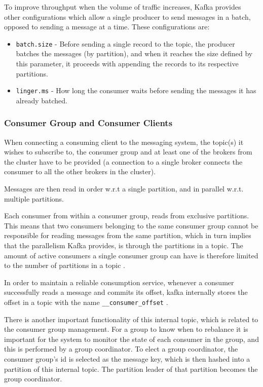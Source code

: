 To improve throughput when the volume of traffic increases, Kafka provides other configurations which allow a single producer to send messages in a batch, opposed to sending a message at a time. These configurations are:
\begin{itemize}
    \item \texttt{batch.size} - Before sending a single record to the topic, the producer batches the messages (by partition), and when it reaches the size defined by this parameter, it proceeds with appending the records to its respective partitions. 
    \item \texttt{linger.ms} - How long the consumer waits before sending the messages it has already batched.
\end{itemize}

\subsubsection{Consumer Group and Consumer Clients}

When connecting a consuming client to the messaging system, the topic(s) it wishes to subscribe to, the consumer group and at least one of the brokers from the cluster have to be provided (a connection to a single broker connects the consumer to all the other brokers in the cluster). 

Messages are then read in order w.r.t a single partition, and in parallel w.r.t. multiple partitions.

Each consumer from within a consumer group, reads from exclusive partitions. This means that two consumers belonging to the same consumer group cannot be responsible for reading messages from the same partition, which in turn implies that the parallelism Kafka provides, is through the partitions in a topic. The amount of active consumers a single consumer group can have is therefore limited to the number of partitions in a topic \cite{OreillyConsumer}. 

In order to maintain a reliable consumption service, whenever a consumer successfully reads a message and commits its offset, kafka internally stores the offset in a topic with the name \texttt{\_\_consumer\_offset} \cite{KafkaConsumer}. 

There is another important functionality of this internal topic, which is related to the consumer group management. For a group to know when to rebalance it is important for the system to monitor the state of each consumer in the group, and this is performed by a group coordinator. To elect a group coordinator, the consumer group's id is selected as the message key, which is then hashed into a partition of this internal topic. The partition leader of that partition becomes the group coordinator.

